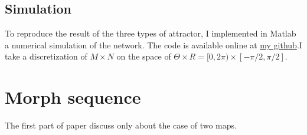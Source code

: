 \documentclass{article}
\begin{document}
	\subsection{Simulation}
	To reproduce the result of the three types of attractor, I implemented in Matlab a numerical simulation of the network. The code is available online at \href{https://github.com/flm8620/Continuous-attractor-network}{my github}.I take a discretization of $M\times N$ on the space of $\Theta\times R = [0,2\pi)\times[-\pi/2,\pi/2]$.

	\section{Morph sequence}
	The first part of paper discuss only about the case of two maps.


\end{document}
